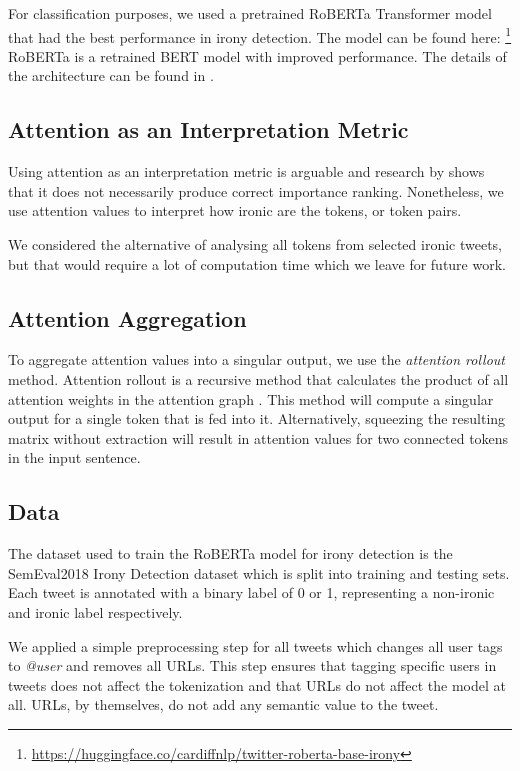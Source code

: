 \documentclass[10pt, a4paper]{article}
\begin{document}
For classification purposes, we used a pretrained RoBERTa Transformer model that had the best performance in irony detection.
The model can be found here:
\footnote{\url{https://huggingface.co/cardiffnlp/twitter-roberta-base-irony}} 
RoBERTa is a retrained BERT model with improved performance. The details of the architecture can be found in \citep{roberta}. 

\subsection{Attention as an Interpretation Metric}

Using attention as an interpretation metric is arguable and research by \cite{attention-interpretable} shows that it does not necessarily produce correct importance ranking.
Nonetheless, we use attention values to interpret how ironic are the tokens, or token pairs.

We considered the alternative of analysing all tokens from selected ironic tweets, but that would require a lot of computation time which we leave for future work.

\subsection{Attention Aggregation}
\label{sec:attaggr}

To aggregate attention values into a singular output, we use the \textit{attention rollout} method.
Attention rollout is a recursive method that calculates the product of all attention weights in the attention graph \citep{quantifying-attention-flow}.
This method will compute a singular output for a single token that is fed into it.
Alternatively, squeezing the resulting matrix without extraction will result in attention values for two connected tokens in the input sentence.

\subsection{Data}

The dataset used to train the RoBERTa model for irony detection is the SemEval2018 Irony Detection dataset \citep{van-hee-etal-2018-semeval} which is split into training and testing sets.
Each tweet is annotated with a binary label of 0 or 1, representing a non-ironic and ironic label respectively.

We applied a simple preprocessing step for all tweets which changes all user tags to \textit{@user} and removes all URLs.
This step ensures that tagging specific users in tweets does not affect the tokenization and that URLs do not affect the model at all.
URLs, by themselves, do not add any semantic value to the tweet.
\end{document}
